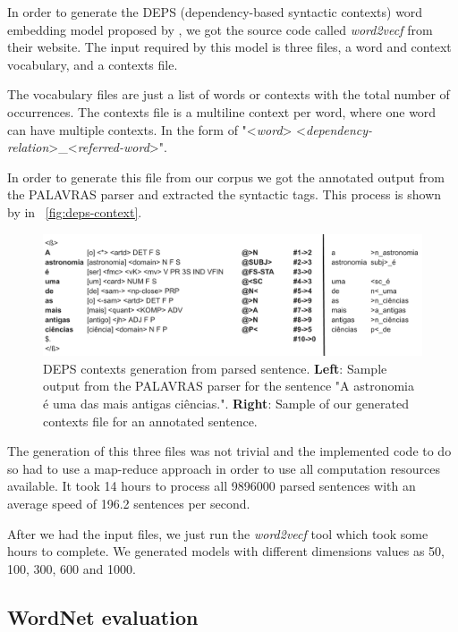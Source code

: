 In order to generate the DEPS (dependency-based syntactic contexts) word embedding model proposed by , we got the source code called \textit{word2vecf} from their website. The input required by this model is three files, a word and context vocabulary, and a contexts file. 

The vocabulary files are just a list of words or contexts with the total number of occurrences. The contexts file is a multiline context per word, where one word can have multiple contexts. In the form of "<\textit{word}> <\textit{dependency-relation}>\_<\textit{referred-word}>".

In order to generate this file from our corpus we got the annotated output from the PALAVRAS parser and extracted the syntactic tags. This process is shown by in ~\autoref{fig:deps-context}.

\begin{figure}[h]
	\caption{DEPS contexts generation from parsed sentence. \textbf{Left}: Sample output from the PALAVRAS parser for the sentence "A astronomia é uma das mais antigas ciências.". \textbf{Right}: Sample of our generated contexts file for an annotated sentence.}
	\label{fig:deps-context}
	\centering%
	\begin{minipage}{.95\textwidth}
		\includegraphics[width=\textwidth]{deps-context.png}
	\end{minipage}
\end{figure}

The generation of this three files was not trivial and the implemented code to do so had to use a map-reduce approach in order to use all computation resources available. It took 14 hours to process all 9896000 parsed sentences with an average speed of 196.2 sentences per second.

After we had the input files, we just run the \textit{word2vecf} tool which took some hours to complete. We generated models with different dimensions values as 50, 100, 300, 600 and 1000.

\subsection{WordNet evaluation}

